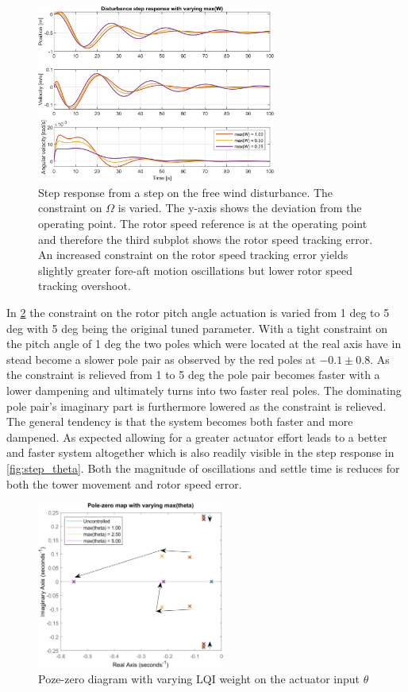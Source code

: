 \begin{figure}[ht]
	\centering
	\includegraphics[width=0.7\textwidth]{Graphics/LQI pole zero/103_step_W.png}
	\caption{Step response from a step on the free wind disturbance. The constraint on $ \Omega $ is varied. The y-axis shows the deviation from the operating point. The rotor speed reference is at the operating point and therefore the third subplot shows the rotor speed tracking error. An increased constraint on the rotor speed tracking error yields slightly greater fore-aft motion oscillations but lower rotor speed tracking overshoot.}
	\label{fig:step_W}
\end{figure}

In \cref{fig:pzmap_theta} the constraint on the rotor pitch angle actuation is varied from 1 deg to 5 deg with 5 deg being the original tuned parameter. With a tight constraint on the pitch angle of 1 deg the two poles which were located at the real axis have in stead become a slower pole pair as observed by the red poles at $ -0.1 \pm0.8 $. As the constraint is relieved from 1 to 5 deg the pole pair becomes faster with a lower dampening and ultimately turns into two faster real poles. The dominating pole pair's imaginary part is furthermore lowered as the constraint is relieved. The general tendency is that the system becomes both faster and more dampened. As expected allowing for a greater actuator effort leads to a better and faster system altogether which is also readily visible in the step response in \cref{fig:step_theta}. Both the magnitude of oscillations and settle time is reduces for both the tower movement and rotor speed error.
\begin{figure}[ht]
	\centering
	\includegraphics[width=0.55\textwidth]{Graphics/LQI pole zero/05_pzmap_theta.png}
	\caption{Poze-zero diagram with varying LQI weight on the actuator input $ \theta $}
	\label{fig:pzmap_theta}
\end{figure}

